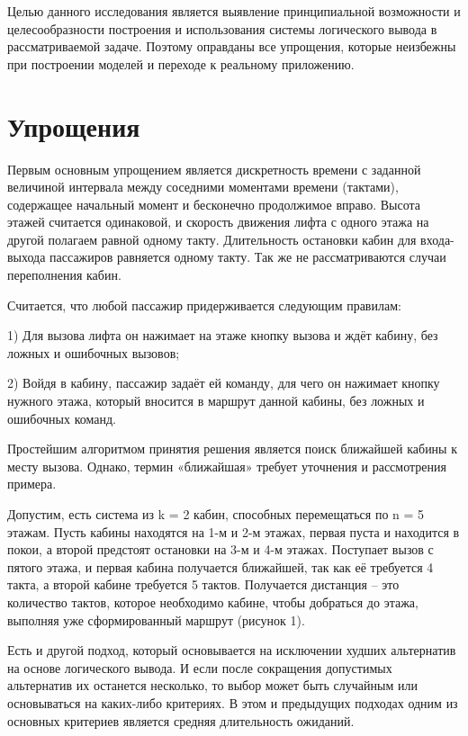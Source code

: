 
	Целью данного исследования является выявление принципиальной возможности и целесообразности построения
		и использования системы логического вывода в рассматриваемой задаче.
		Поэтому оправданы все упрощения, которые неизбежны при построении моделей и переходе к реальному приложению.

\section{Упрощения}
	Первым основным упрощением является дискретность времени с заданной величиной интервала между
		соседними моментами времени (тактами), содержащее начальный момент и бесконечно продолжимое вправо.
		Высота этажей считается одинаковой, и скорость движения лифта с одного этажа на другой полагаем
		равной одному такту. Длительность остановки кабин для входа-выхода пассажиров равняется одному такту.
		Так же не рассматриваются случаи переполнения кабин.

	Считается, что любой пассажир придерживается следующим правилам:

	1) Для вызова лифта он нажимает на этаже кнопку вызова и ждёт кабину, без ложных и ошибочных вызовов;

	2) Войдя в кабину, пассажир задаёт ей команду, для чего он нажимает кнопку нужного этажа,
		который вносится в маршрут данной кабины, без ложных и ошибочных команд.

	Простейшим алгоритмом принятия решения является поиск ближайшей кабины к месту вызова.
		Однако, термин «ближайшая» требует уточнения и рассмотрения примера. 

	Допустим, есть система из k = 2 кабин, способных перемещаться по n = 5 этажам.
		Пусть кабины находятся на 1-м и 2-м этажах, первая пуста и находится в покои,
		а второй предстоят остановки на 3-м и 4-м этажах. Поступает вызов с пятого этажа,
		и первая кабина получается ближайшей, так как её требуется 4 такта,
		а второй кабине требуется 5 тактов. Получается дистанция – это количество тактов,
		которое необходимо кабине, чтобы добраться до этажа, выполняя уже сформированный маршрут (рисунок 1).

	Есть и другой подход, который основывается на исключении худших альтернатив на основе логического вывода.
		И если после сокращения допустимых альтернатив их останется несколько,
		то выбор может быть случайным или основываться на каких-либо критериях.
		В этом и предыдущих подходах одним из основных критериев является средняя длительность ожиданий.

